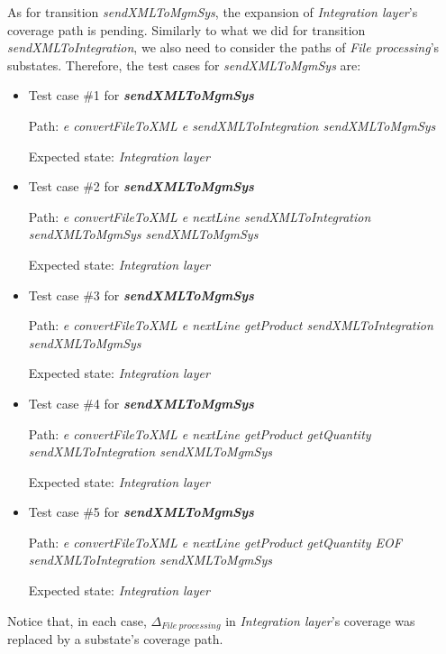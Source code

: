 As for transition \textit{sendXMLToMgmSys}, the expansion of \textit{Integration layer}'s coverage path is pending. Similarly to what we did for transition \textit{sendXMLToIntegration}, we also need to consider the paths of \textit{File processing}'s substates. Therefore, the test cases for \textit{sendXMLToMgmSys} are:

\begin{itemize}

\item Test case \#1 for \textit{\textbf{sendXMLToMgmSys}}

Path: \textit{e convertFileToXML e sendXMLToIntegration sendXMLToMgmSys}

Expected state: \textit{Integration layer}

\item Test case \#2 for \textit{\textbf{sendXMLToMgmSys}}

Path: \textit{e convertFileToXML e  nextLine sendXMLToIntegration sendXMLToMgmSys sendXMLToMgmSys}

Expected state: \textit{Integration layer}


\item Test case \#3 for \textit{\textbf{sendXMLToMgmSys}}

Path: \textit{e convertFileToXML e  nextLine  getProduct sendXMLToIntegration sendXMLToMgmSys}

Expected state: \textit{Integration layer}

\item Test case \#4 for \textit{\textbf{sendXMLToMgmSys}}

Path: \textit{e convertFileToXML e  nextLine  getProduct  getQuantity sendXMLToIntegration sendXMLToMgmSys}

Expected state: \textit{Integration layer}

\item Test case \#5 for \textit{\textbf{sendXMLToMgmSys}}

Path: \textit{e convertFileToXML e  nextLine  getProduct  getQuantity EOF sendXMLToIntegration sendXMLToMgmSys}

Expected state: \textit{Integration layer}

\end{itemize}

Notice that, in each case, $\Delta_{File\ processing}$ in \textit{Integration layer}'s coverage was replaced by a substate's coverage path.

